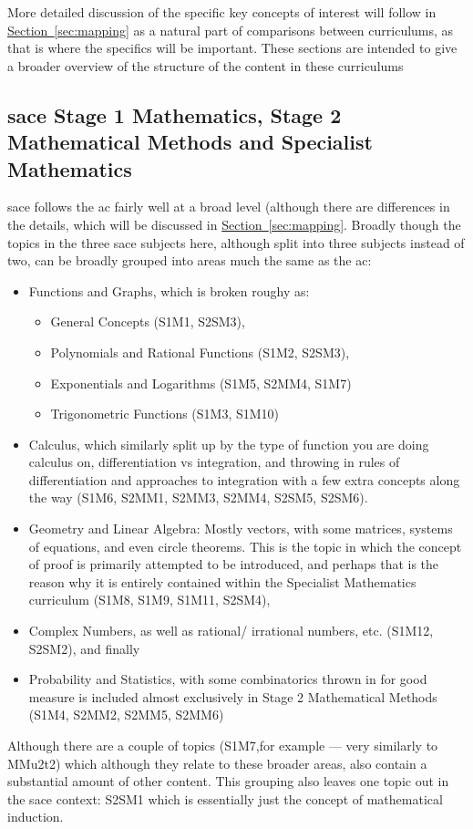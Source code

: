 \documentclass[twoside,12pt,a4paper]{report}
\newcommand{\refsec}[1]{\hyperref[sec:#1]{Section~\ref{sec:#1}}}
\begin{document}
More detailed discussion of the specific key concepts of interest will follow in \refsec{mapping} as a natural part of comparisons between curriculums, as that is where the specifics will be important. These sections are intended to give a broader overview of the structure of the content in these curriculums

\subsection{\gls{sace} Stage 1 Mathematics, Stage 2 Mathematical Methods and Specialist Mathematics}

\gls{sace} follows the \gls{ac} fairly well at a broad level (although there are differences in the details, which will be discussed in \refsec{mapping}. Broadly though the topics in the three \gls{sace} subjects here, although split into three subjects instead of two, can be broadly grouped into areas much the same as the \gls{ac}:
\begin{itemize}
	\item Functions and Graphs, which is broken roughy as:
		\begin{itemize}	
			\item General Concepts (S1M1, S2SM3),
			\item Polynomials and Rational Functions (S1M2, S2SM3),
			\item Exponentials and Logarithms (S1M5, S2MM4, S1M7)
			\item Trigonometric Functions (S1M3, S1M10)
		\end{itemize}
	\item Calculus, which similarly split up by the type of function you are doing calculus on, differentiation vs integration, and throwing in rules of differentiation and approaches to integration with a few extra concepts along the way (S1M6, S2MM1, S2MM3, S2MM4, S2SM5, S2SM6).
	\item Geometry and Linear Algebra: Mostly vectors, with some matrices, systems of equations, and even circle theorems. This is the topic in which the concept of proof is primarily attempted to be introduced, and perhaps that is the reason why it is entirely contained within the Specialist Mathematics curriculum (S1M8, S1M9, S1M11, S2SM4),
	\item Complex Numbers, as well as rational/ irrational numbers, etc. (S1M12, S2SM2), and finally
	\item Probability and Statistics, with some combinatorics thrown in for good measure is included almost exclusively in Stage 2 Mathematical Methods (S1M4, S2MM2, S2MM5, S2MM6)
\end{itemize}
Although there are a couple of topics (S1M7,for example --- very similarly to MMu2t2) which although they relate to these broader areas, also contain a substantial amount of other content. This grouping also leaves one topic out in the \gls{sace} context: S2SM1 which is essentially just the concept of mathematical induction.
\end{document}
